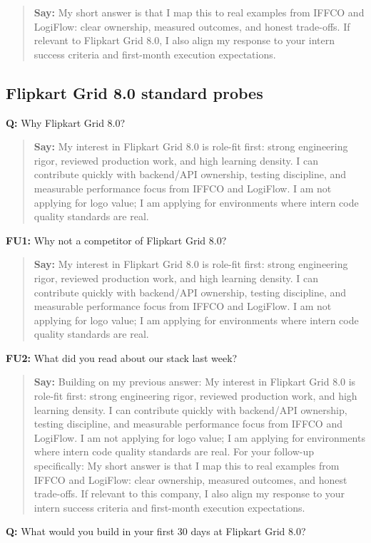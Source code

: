 \documentclass[9pt,a4paper]{article}
\begin{document}
\begin{quote}\small\textbf{Say:} My short answer is that I map this to real examples from IFFCO and LogiFlow: clear ownership, measured outcomes, and honest trade-offs. If relevant to Flipkart Grid 8.0, I also align my response to your intern success criteria and first-month execution expectations.\end{quote}
\vspace{2mm}
\subsection{Flipkart Grid 8.0 standard probes}
\textbf{Q:} Why Flipkart Grid 8.0?

\begin{quote}\small\textbf{Say:} My interest in Flipkart Grid 8.0 is role-fit first: strong engineering rigor, reviewed production work, and high learning density. I can contribute quickly with backend/API ownership, testing discipline, and measurable performance focus from IFFCO and LogiFlow. I am not applying for logo value; I am applying for environments where intern code quality standards are real.\end{quote}
\vspace{2mm}
\textbf{FU1:} Why not a competitor of Flipkart Grid 8.0?

\begin{quote}\small\textbf{Say:} My interest in Flipkart Grid 8.0 is role-fit first: strong engineering rigor, reviewed production work, and high learning density. I can contribute quickly with backend/API ownership, testing discipline, and measurable performance focus from IFFCO and LogiFlow. I am not applying for logo value; I am applying for environments where intern code quality standards are real.\end{quote}
\vspace{2mm}
\textbf{FU2:} What did you read about our stack last week?

\begin{quote}\small\textbf{Say:} Building on my previous answer: My interest in Flipkart Grid 8.0 is role-fit first: strong engineering rigor, reviewed production work, and high learning density. I can contribute quickly with backend/API ownership, testing discipline, and measurable performance focus from IFFCO and LogiFlow. I am not applying for logo value; I am applying for environments where intern code quality standards are real. For your follow-up specifically: My short answer is that I map this to real examples from IFFCO and LogiFlow: clear ownership, measured outcomes, and honest trade-offs. If relevant to this company, I also align my response to your intern success criteria and first-month execution expectations.\end{quote}
\vspace{2mm}
\textbf{Q:} What would you build in your first 30 days at Flipkart Grid 8.0?
\end{document}
